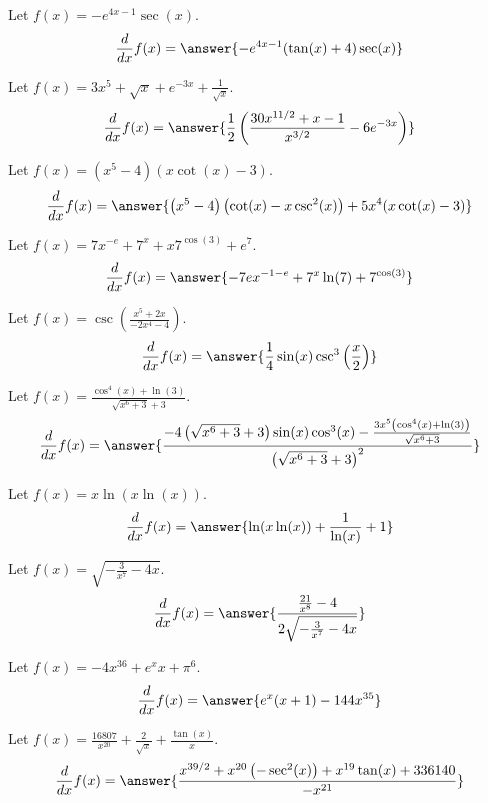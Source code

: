 \documentclass{ximera}
\begin{document}
\begin{shuffle}
\begin{exercise}
Let $f(x)=-e^{4 x-1} \sec (x)$.
\[
\ddx f(x) = \answer{-e^{4 x-1} (\tan (x)+4) \sec (x)}
\]
\end{exercise}

\begin{exercise}
Let $f(x)=3 x^5+\sqrt{x}+e^{-3 x}+\frac{1}{\sqrt{x}}$.
\[
\ddx f(x) = \answer{\frac{1}{2} \left(\frac{30 x^{11/2}+x-1}{x^{3/2}}-6 e^{-3 x}\right)}
\]
\end{exercise}

\begin{exercise}
Let $f(x)=\left(x^5-4\right) (x \cot (x)-3)$.
\[
\ddx f(x) = \answer{\left(x^5-4\right) \left(\cot (x)-x \csc ^2(x)\right)+5 x^4 (x \cot (x)-3)}
\]
\end{exercise}

\begin{exercise}
Let $f(x)=7 x^{-e}+7^x+x 7^{\cos (3)}+e^7$.
\[
\ddx f(x) = \answer{-7 e x^{-1-e}+7^x \ln (7)+7^{\cos (3)}}
\]
\end{exercise}

\begin{exercise}
Let $f(x)=\csc \left(\frac{x^5+2 x}{-2 x^4-4}\right)$.
\[
\ddx f(x) = \answer{\frac{1}{4} \sin (x) \csc ^3\left(\frac{x}{2}\right)}
\]
\end{exercise}

\begin{exercise}
Let $f(x)=\frac{\cos ^4(x)+\ln (3)}{\sqrt{x^6+3}+3}$.
\[
\ddx f(x) = \answer{\frac{-4 \left(\sqrt{x^6+3}+3\right) \sin (x) \cos ^3(x)-\frac{3 x^5 \left(\cos ^4(x)+\ln (3)\right)}{\sqrt{x^6+3}}}{\left(\sqrt{x^6+3}+3\right)^2}}
\]
\end{exercise}

\begin{exercise}
Let $f(x)=x \ln (x \ln (x))$.
\[
\ddx f(x) = \answer{\ln (x \ln (x))+\frac{1}{\ln (x)}+1}
\]
\end{exercise}

\begin{exercise}
Let $f(x)=\sqrt{-\frac{3}{x^7}-4 x}$.
\[
\ddx f(x) = \answer{\frac{\frac{21}{x^8}-4}{2 \sqrt{-\frac{3}{x^7}-4 x}}}
\]
\end{exercise}

\begin{exercise}
Let $f(x)=-4 x^{36}+e^x x+\pi ^6$.
\[
\ddx f(x) = \answer{e^x (x+1)-144 x^{35}}
\]
\end{exercise}

\begin{exercise}
Let $f(x)=\frac{16807}{x^{20}}+\frac{2}{\sqrt{x}}+\frac{\tan (x)}{x}$.
\[
\ddx f(x) = \answer{\frac{x^{39/2}+x^{20} \left(-\sec ^2(x)\right)+x^{19} \tan (x)+336140}{-x^{21}}}
\]
\end{exercise}


\end{shuffle}
\end{document}
